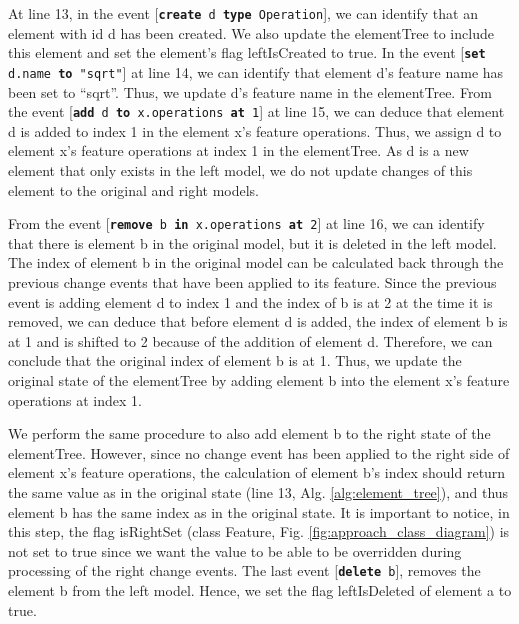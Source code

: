 At line 13, in the event [\texttt{\small \textbf{create} d \textbf{type} Operation}], we can identify that an element with id \textsf{d} has been created. We also update the \textsf{elementTree} to include this element and set the element's flag \textsf{leftIsCreated} to \textsf{true}. In the event [\texttt{\small \textbf{set} d.name \textbf{to} "sqrt"}] at line 14, we can identify that element \textsf{d}'s feature \textsf{name} has been set to ``sqrt''. Thus, we update \textsf{d}'s feature \textsf{name} in the \textsf{elementTree}. From the event [\texttt{\small \textbf{add} d \textbf{to} x.operations \textbf{at} 1}] at line 15, we can deduce that element \textsf{d} is added to index 1 in the element \textsf{x}'s feature \textsf{operations}. Thus, we assign \textsf{d} to element \textsf{x}'s feature \textsf{operations} at index 1 in the \textsf{elementTree}. As \textsf{d} is a new element that only exists in the left model, we do not update changes of this element to the original and right models. 

From the event [\texttt{\small \textbf{remove} b \textbf{in} x.operations \textbf{at} 2}] at line 16, we can identify that there is element \textsf{b} in the original model, but it is deleted in the left model. The index of element \textsf{b} in the original model can be calculated back through the previous change events that have been applied to its feature. Since the previous event is adding element \textsf{d} to index 1 and the index of \textsf{b} is at 2 at the time it is removed, we can deduce that before element \textsf{d} is added, the index of element \textsf{b} is at 1 and is shifted to 2 because of the addition of element \textsf{d}.  Therefore, we can conclude that the original index of element \textsf{b} is at 1. Thus, we update the original state of the \textsf{elementTree} by adding element \textsf{b} into the element \textsf{x}'s feature \textsf{operations} at index 1.  

We perform the same procedure to also add element \textsf{b} to the right state of the \textsf{elementTree}. However, since no change event has been applied to the right side of element \textsf{x}'s feature \textsf{operations}, the calculation of element \textsf{b}'s index should return the same value as in the original state (line 13, Alg. \ref{alg:element_tree}), and thus element \textsf{b} has the same index as in the original state. It is important to notice, in this step, the flag \textsf{isRightSet} (class \textsf{Feature}, Fig. \ref{fig:approach_class_diagram}) is not set to \textsf{true} since we want the value to be able to be overridden during processing of the right change events. The last event [\texttt{\small \textbf{delete} b}], removes the element \textsf{b} from the left model. Hence, we set the flag \textsf{leftIsDeleted} of element \textsf{a} to \textsf{true}.

